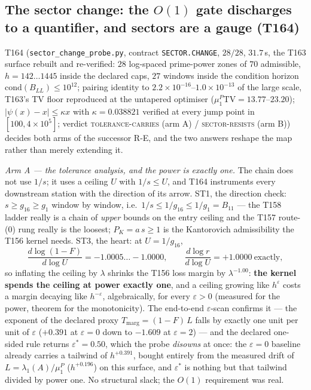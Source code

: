 \documentclass[11pt,a4paper]{article}
\begin{document}
\subsection{The sector change: the $O(1)$ gate discharges to a quantifier, and
sectors are a gauge (T164)}
T164 (\texttt{sector\_change\_probe.py}, contract \texttt{SECTOR.CHANGE},
$28/28$, $31.7$\,s, the T163 surface rebuilt and re-verified: $28$ log-spaced
prime-power zones of $70$ admissible, $h=142\ldots1445$ inside the declared
caps, $27$ windows inside the condition horizon
$\mathrm{cond}(B_{LL})\le10^{12}$; pairing identity to
$2.2\times10^{-16}$--$1.0\times10^{-13}$ of the large scale, T163's TV floor
reproduced at the untapered optimiser ($\mu^P_1\mathrm{TV}=13.77$--$23.20$);
$|\psi(x)-x|\le\kappa x$ with $\kappa=0.038821$ verified at every jump point in
$[100,4\times10^{5}]$; verdict \textsc{tolerance-carries} (arm A) /
\textsc{sector-resists} (arm B)) decides both arms of the successor R-E, and
the two answers reshape the map rather than merely extending it.

\emph{Arm A --- the tolerance analysis, and the power is exactly one.} The
chain does not use $1/s$; it uses a ceiling $U$ with $1/s\le U$, and T164
instruments every downstream station with the direction of its arrow. ST1, the
direction check: $s\ge g_{16}\ge g_1$ window by window, i.e.\
$1/s\le1/g_{16}\le1/g_1=B_{11}$ --- the T158 ladder really is a chain of
\emph{upper} bounds on the entry ceiling and the T157 route-(0) rung really is
the loosest; $P_K=\hat a\,s\ge1$ is the Kantorovich admissibility the T156
kernel needs. ST3, the heart: at $U=1/g_{16}$,
\[
\frac{d\log(1-F)}{d\log U}=-1.0005\ldots-1.0000,\qquad
\frac{d\log r}{d\log U}=+1.0000\ \text{exactly},
\]
so inflating the ceiling by $\lambda$ shrinks the T156 loss margin by
$\lambda^{-1.00}$: \textbf{the kernel spends the ceiling at power exactly one},
and a ceiling growing like $h^{\varepsilon}$ costs a margin decaying like
$h^{-\varepsilon}$, algebraically, for every $\varepsilon>0$ (measured for the
power, theorem for the monotonicity). The end-to-end $\varepsilon$-scan
confirms it --- the exponent of the declared proxy
$T_{\mathrm{marg}}=(1-F)\,L$ falls by exactly one unit per unit of
$\varepsilon$ ($+0.391$ at $\varepsilon=0$ down to $-1.609$ at $\varepsilon=2$)
--- and the declared one-sided rule returns $\varepsilon^*=0.50$, which the
probe \emph{disowns} at once: the $\varepsilon=0$ baseline already carries a
tailwind of $h^{+0.391}$, bought entirely from the measured drift of
$L=\lambda_1(A)/\mu^P_1$ ($h^{+0.196}$) on this surface, and $\varepsilon^*$ is
nothing but that tailwind divided by power one. No structural slack; the
$O(1)$ requirement was real.
\end{document}
